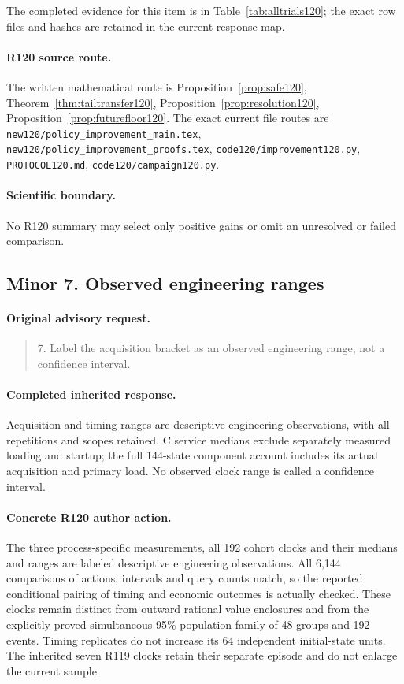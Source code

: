 The completed evidence for this item is in Table~\ref{tab:alltrials120}; the exact row files and hashes are retained in the current response map.
\paragraph{R120 source route.}
The written mathematical route is Proposition~\ref{prop:safe120}, Theorem~\ref{thm:tailtransfer120}, Proposition~\ref{prop:resolution120}, Proposition~\ref{prop:futurefloor120}. The exact current file routes are \nolinkurl{new120/policy_improvement_main.tex}, \nolinkurl{new120/policy_improvement_proofs.tex}, \nolinkurl{code120/improvement120.py}, \nolinkurl{PROTOCOL120.md}, \nolinkurl{code120/campaign120.py}.
\paragraph{Scientific boundary.}
No R120 summary may select only positive gains or omit an unresolved or failed comparison.

\subsection{Minor 7. Observed engineering ranges}
\label{response120:minor-7}
\paragraph{Original advisory request.}
\begin{quote}
7. Label the acquisition bracket as an observed engineering range, not a confidence interval.
\end{quote}
\paragraph{Completed inherited response.}
Acquisition and timing ranges are descriptive engineering observations, with all repetitions and scopes retained. C service medians exclude separately measured loading and startup; the full 144-state component account includes its actual acquisition and primary load. No observed clock range is called a confidence interval.
\paragraph{Concrete R120 author action.}
The three process-specific measurements, all 192 cohort clocks and their medians and ranges are labeled descriptive engineering observations. All 6,144 comparisons of actions, intervals and query counts match, so the reported conditional pairing of timing and economic outcomes is actually checked. These clocks remain distinct from outward rational value enclosures and from the explicitly proved simultaneous 95\% population family of 48 groups and 192 events. Timing replicates do not increase its 64 independent initial-state units. The inherited seven R119 clocks retain their separate episode and do not enlarge the current sample.

